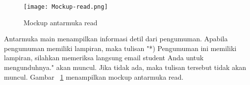 \begin{figure}[H]
	\centering  
	\texttt{[image: Mockup-read.png]}  
	\caption[Mockup antarmuka read]{Mockup antarmuka read} 
	\label{fig:mockup-main} 
\end{figure}

Antarmuka main menampilkan informasi detil dari pengumuman. Apabila pengumuman memiliki lampiran, maka tulisan "*) Pengumuman ini memiliki lampiran, silahkan memeriksa langsung email student Anda untuk mengunduhnya." akan muncul. Jika tidak ada, maka tulisan tersebut tidak akan muncul. Gambar~ \ref{fig:mockup-main} menampilkan mockup antarmuka read.